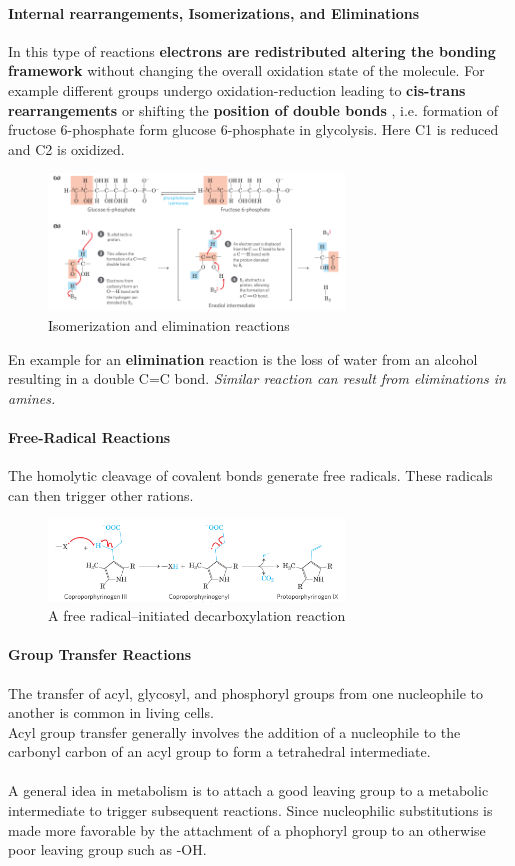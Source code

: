 \documentclass[../main.tex]{subfiles}
\begin{document}
\paragraph{Internal rearrangements, Isomerizations, and Eliminations}
In this type of reactions \textbf{electrons are redistributed altering the bonding framework} without changing the overall oxidation state of the molecule. For example different groups undergo oxidation-reduction leading to \textbf{cis-trans rearrangements} or shifting the \textbf{position of double bonds} , i.e. formation of fructose 6-phosphate form glucose 6-phosphate in glycolysis. Here C1 is reduced and C2 is oxidized. 
\begin{figure}[H]
	\centering
	\includegraphics[width=0.7\textwidth]{changeposition}
	\caption{Isomerization and elimination reactions}
\end{figure}
En example for an \textbf{elimination} reaction is the loss of water from an alcohol resulting in a double C=C bond. \textit{Similar reaction can result from eliminations in amines.}

\paragraph{Free-Radical Reactions}
The homolytic cleavage of covalent bonds generate free radicals. These radicals can then trigger other rations.   
\begin{figure}[H]
	\centering
	\includegraphics[width=0.7\textwidth]{radicals}
	\caption{A free radical–initiated decarboxylation reaction}
\end{figure}

\paragraph{Group Transfer Reactions}
The transfer of acyl, glycosyl, and phosphoryl groups from one nucleophile to another is common in living cells. \\
Acyl group transfer generally involves the addition of a nucleophile to the carbonyl carbon of an acyl group to form a tetrahedral intermediate.  \\
\\
A general idea in metabolism is to attach a good leaving group to a metabolic intermediate to trigger subsequent reactions. Since nucleophilic substitutions is made more favorable by the attachment of a phophoryl group to an otherwise poor leaving group such as -OH. 
\end{document}
